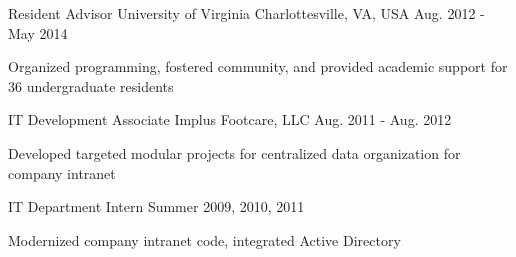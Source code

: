 \begin{cventries}
    \cventry
      {Resident Advisor}
      {University of Virginia}
      {Charlottesville, VA, USA}
      {Aug. 2012 - May 2014}
      {
        \begin{cvitems}
          \item Organized programming, fostered community, and provided academic support for 36 undergraduate residents
        \end{cvitems}
      }

    \cventry
      {IT Development Associate}
      {Implus Footcare, LLC}
      {}
      {Aug. 2011 - Aug. 2012}
      {
        \begin{cvitems}
          \item Developed targeted modular projects for centralized data organization for company intranet
        \end{cvitems}
      }

    \cventry
    {IT Department Intern}
    {}
    {}
    {Summer 2009, 2010, 2011}
    {
      \begin{cvitems}
        \item Modernized company intranet code, integrated Active Directory
      \end{cvitems}
    }

  \end{cventries}

